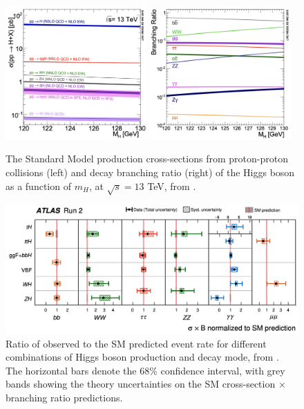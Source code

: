 \begin{figure}[h!]
    \center
    \includegraphics[width=0.48\textwidth]{Images/Theory/prodHiggs.png}
    \includegraphics[width=0.48\textwidth]{Images/Theory/decayHiggs.png}
    \caption{The Standard Model production cross-sections from proton-proton collisions (left) and decay branching ratio (right) of the Higgs boson as a function of $m_H$, at $\sqrt{s} = 13$ TeV, from \cite{LHCHiggsCrossSectionWorkingGroup:2016ypw}.}
    \label{fig:prodHcross}
\end{figure}
\begin{figure}[h!]
    \hspace{-0.48cm}
    \includegraphics[width=\textwidth]{Images/Theory/allMesRun2.png}
    \caption{Ratio of observed to the SM predicted event rate for different combinations of Higgs boson production and decay mode, from \cite{ATLAS:2022vkf}. The horizontal bars denote the 68\% confidence interval, with grey bands showing the theory uncertainties on the SM cross-section $\times$ branching ratio predictions.}
    \label{fig:measprodH}
\end{figure}

